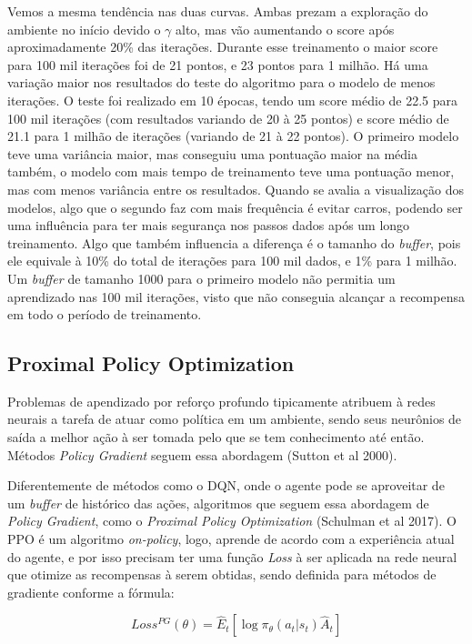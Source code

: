 \documentclass[letterpaper]{article} %
\begin{document}
Vemos a mesma tendência nas duas curvas. Ambas prezam a exploração do ambiente no início devido o $\gamma$ alto, mas vão aumentando o score após aproximadamente 20\% das iterações. Durante esse treinamento o maior score para 100 mil iterações foi de 21 pontos, e 23 pontos para 1 milhão. Há uma variação maior nos resultados do teste do algoritmo para o modelo de menos iterações. O teste foi realizado em 10 épocas, tendo um score médio de 22.5 para 100 mil iterações (com resultados variando de 20 à 25 pontos) e score médio de 21.1 para 1 milhão de iterações (variando de 21 à 22 pontos). O primeiro modelo teve uma variância maior, mas conseguiu uma pontuação maior na média também, o modelo com mais tempo de treinamento teve uma pontuação menor, mas com menos variância entre os resultados. Quando se avalia a visualização dos modelos, algo que o segundo faz com mais frequência é evitar carros, podendo ser uma influência para ter mais segurança nos passos dados após um longo treinamento. Algo que também influencia a diferença é o tamanho do \textit{buffer}, pois ele equivale à 10\% do total de iterações para 100 mil dados, e 1\% para 1 milhão. Um \textit{buffer} de tamanho 1000 para o primeiro modelo não permitia um aprendizado nas 100 mil iterações, visto que não conseguia alcançar a recompensa em todo o período de treinamento.


\subsection{Proximal Policy Optimization}
Problemas de apendizado por reforço profundo tipicamente atribuem à redes neurais a tarefa de atuar como política em um ambiente, sendo seus neurônios de saída a melhor ação à ser tomada pelo que se tem conhecimento até então. Métodos \textit{Policy Gradient} seguem essa abordagem (Sutton et al 2000).

Diferentemente de métodos como o DQN, onde o agente pode se aproveitar de um \textit{buffer} de histórico das ações, algoritmos que seguem essa abordagem de \textit{Policy Gradient}, como o \textit{Proximal Policy Optimization} (Schulman et al 2017). O PPO é um algoritmo \textit{on-policy}, logo, aprende de acordo com a experiência atual do agente, e por isso precisam ter uma função \textit{Loss} à ser aplicada na rede neural que otimize as recompensas à serem obtidas, sendo definida para métodos de gradiente conforme a fórmula:

$$
Loss^{PG}(\theta) =  \hat{E}_t[\log \pi_{\theta}(a_t | s_t) \hat{A}_t]
$$
\end{document}
